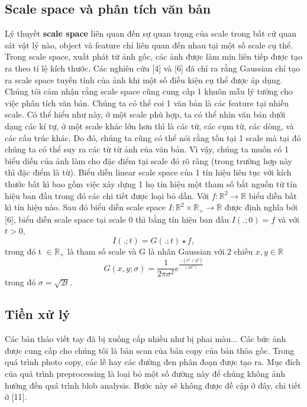 \documentclass[a4paper]{article}
\begin{document}
\subsection{Scale space và phân tích văn bản}
Lý thuyết \textbf{scale space} liên quan đến sự quan trọng của scale trong bất cứ quan sát vật lý nào, object và feature chỉ liên quan đến nhau tại một số scale cụ thể. Trong scale space, xuất phát từ ảnh gốc, các ảnh được làm mịn liên tiếp được tạo ra theo tỉ lệ kích thước. Các nghiên cứu [4] và [6] đã chỉ ra rằng Gaussian chỉ tạo ra scale space tuyến tính của ảnh khi một số điều kiện cụ thể được áp dụng.\\
Chúng tôi cảm nhận rằng scale space cũng cung cấp 1 khuôn mẫu lý tưởng cho việc phân tích văn bản. Chúng ta có thể coi 1 văn bản là các feature tại nhiều scale. Có thể hiểu như này, ở một scale phù hợp, ta có thể nhìn văn bản dưới dạng các kí tự, ở một scale khác lớn hơn thì là các từ, các cụm từ, các dòng, và các cấu trúc khác. Do đó, chúng ta cũng có thể nói rằng tồn tại 1 scale mà tại đó chúng ta có thể suy ra các từ từ ảnh của văn bản. Vì vậy, chúng ta muốn có 1 biểu diễn của ảnh làm cho đặc điểm tại scale đó rõ ràng (trong trường hợp này thì đặc điểm là từ). Biểu diễn linear scale space của 1 tín hiệu liên tục với kích thước bất kì bao gồm việc xây dựng 1 họ tín hiệu một tham số bắt nguồn từ tín hiệu ban đầu trong đó các chi tiết được loại bỏ dần. Với $f: \mathbb{R}^2 \rightarrow \mathbb{R}$ biểu diễn bất kì tín hiệu nào. Sau đó biểu diễn scale space $I: \mathbb{R}^2 \times \mathbb{R}_+ \rightarrow \mathbb{R}$ được định nghĩa bởi [6], biểu diễn scale space tại scale $0$ thì bằng tín hiệu ban đầu $I(.; 0) = f$ và với $t > 0$,
\begin{equation}
    I(.;t) = G(.;t) \star f,
\end{equation}
trong đó t $\in \mathbb R_+$ là tham số scale và G là nhân Gaussian với 2 chiều $x, y \in \mathbb R$
\begin{equation}
    G(x, y;\sigma) = \frac 1 {2\pi\sigma^2}e^{\frac {-(x^2 + y^2)}{(2\sigma^2)}}
\end{equation}
trong đó $\sigma = \sqrt {2t}$.

\subsection{Tiền xử lý}
Các bản thảo viết tay đã bị xuống cấp nhiều như bị phai màu... Các bức ảnh được cung cấp cho chúng tôi là bản scan của bản copy của bản thỏa gốc. Trong quá trình photo copy, các lề hay các đường đen phân đoạn được tạo ra.  Mục đích của quá trình preprocessing là loại bỏ một số đường này để chúng không ảnh hưởng đến quá trình blob analysis. Bước này sẽ không được đề cập ở đây, chi tiết ở [11].
\end{document}
